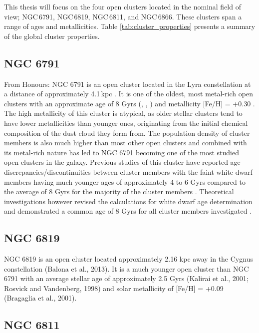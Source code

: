 This thesis will focus on the four open clusters located in the nominal \Kepler field of view; NGC\,6791, NGC\,6819, NGC\,6811, and NGC\,6866. These clusters span a range of ages and metallicities. Table \ref{tab:cluster_properties} presents a summary of the global cluster properties.

\subsection{NGC 6791}

From Honours: 
NGC 6791 is an open cluster located in the Lyra constellation at a distance of approximately 4.1\,kpc \citep{basu_determination_2010}. It is one of the oldest, most metal-rich open clusters with an approximate age of 8 Gyrs (\citet{grundahl_2008}, \citet{king2005}, \citet{stetson_2003}) and metallicity [Fe/H] = +0.30 \citep{boesgaard_2009}. The high metallicity of this cluster is atypical, as older stellar clusters tend to have lower metallicities than younger ones, originating from the initial chemical composition of the dust cloud they form from. The population density of cluster members is also much higher than most other open clusters and combined with its metal-rich nature has led to NGC 6791 becoming one of the most studied open clusters in the galaxy. Previous studies of this cluster have reported age discrepancies/discontinuities between cluster members with the faint white dwarf members having much younger ages of approximately 4 to 6 Gyrs compared to the average of 8 Gyrs for the majority of the cluster members \citep{Bedin2008}. Theoretical investigations however revised the calculations for white dwarf age determination and demonstrated a common age of 8 Gyrs for all cluster members investigated \citep{Garciaberro2010}. 

\subsection{NGC 6819}

NGC 6819 is an open cluster located approximately 2.16 kpc away in the Cygnus constellation (Balona et al., 2013). It is a much younger open cluster than NGC 6791 with an average stellar age of approximately 2.5 Gyrs (Kalirai et al., 2001; Rosvick and Vandenberg, 1998) and solar metallicity of [Fe/H] = +0.09 (Bragaglia et al., 2001).


\subsection{NGC 6811}

